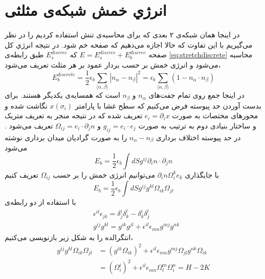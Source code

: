 \section{
انرژي خمش شبکه‌ی مثلثی
}
در اینجا همان شبکه‌ی ۲ بعدی که برای محاسبه‌ی تنش استفاده کردیم را در نظر می‌گیریم با این تفاوت که حالا اجازه می‌دهیم که صفحه خم شود. در نتیجه انرژي کل صفحه 
$E=E_s^{discree}+E_b^{discree}$
که $E_s^{discree}$
طبق رابطه‌ی 
\ref{eq:stretchdiscrete}
محاسبه می‌شود و انرژی خمش بر حسب بردار عمود بر هر مثلث تعریف می‌شود،
\begin{equation}
E_b^{discrete}=\frac{1}{2}\epsilon_b\sum_{\langle\alpha,\beta\rangle}|n_\alpha-n_\beta|^2=\epsilon_b\sum_{\langle\alpha,\beta\rangle}\left(1-n_\alpha\cdot n_\beta\right)
\label{eq:bending}
\end{equation}
در اینجا جمع روی تمام جفت‌های 
$n_\alpha$
و 
$n_\beta$ 
است که همسایه‌ی یکدیگر هستند. برای بدست‌ آوردن حد پیوسته‌ فرض می‌کنیم که سطح غشا با پارامتر 
$x(\sigma_i)$
نگاشت شده و محورهای مختصات به صورت 
$e_i=\partial_ix$
تعریف شده که در نتیجه منجر به تعریف متریک و ساختار بنیادی دوم
 به ترتیب به صورت 
$g_{ij}=e_i\cdot e_j$
و
$\Omega_{ij}=e_i\cdot\partial_jn$
تعریف می‌شود 
\cite{DubrovinModernGeometry}
. در حد پیوسته اختلاف برداری 
$n_\alpha-n_\beta$
را به صورت گرادیان میدان برداری نوشته می‌شود
\begin{equation}
E_b=\frac{1}{2}\epsilon_b\int dSg^{ij}\partial_in\cdot\partial_jn
\end{equation}
با جایگذاری 
$\partial_in\Omega_i^ke_k$
می‌توانیم انرژی خمش را بر حسب 
$\Omega_{ij}$
تعریف کنیم
\begin{equation}
E_b=\frac{1}{2}\epsilon_b\int dSg^{ij}g^{kl}\Omega_{ik}\Omega_{jl}
\end{equation}
با استفاده از دو رابطه‌ی 
\begin{equation}
\begin{aligned}
&\epsilon^{il}\epsilon_{jk}=\delta_j^i\delta_k^l-\delta_k^i\delta_j^l\\
&g^{ij}g^{kl}=g^{ik}g^{jl}+\epsilon^{il}\epsilon_{mn}g^{mj}g^{nk}
\end{aligned}
\end{equation}
انتگرالده را به شکل زیر بازنویسی می‌کنیم،
\begin{equation}
\begin{aligned}
g^{ij}g^{kl}\Omega_{ik}\Omega_{jl}&=(g^{ik}\Omega_{ik})^2+\epsilon^{il}\epsilon_{mn}g^{mj}\Omega_{jl}g^{nk}\Omega_{ik}\\
&=(\Omega_i^i)^2+\epsilon^{il}\epsilon_{mn}\Omega_l^m\Omega_i^n=H-2K
\end{aligned}
\end{equation}

